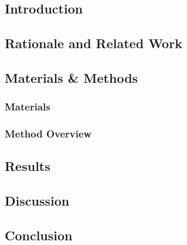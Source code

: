 \subsection{Introduction}

\subsection{Rationale and Related Work}

\subsection{Materials \& Methods}

\subsubsection{Materials}

\subsubsection{Method Overview}


\subsection{Results}

\subsection{Discussion}

\subsection{Conclusion}




